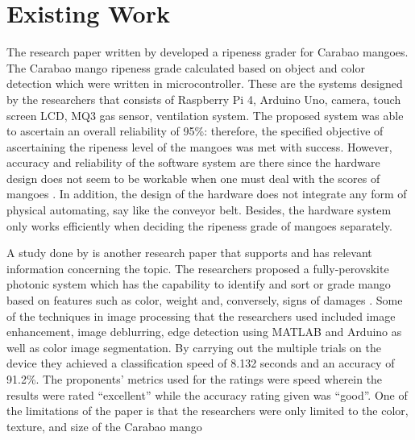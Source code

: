 

\section{Existing Work}

The research paper written by \citet{adam-non-destructive-2022} developed a ripeness grader for
Carabao mangoes. The Carabao mango ripeness grade calculated based on object and
color detection which were written in microcontroller. These are the systems designed
by the researchers that consists of Raspberry Pi 4, Arduino Uno, camera, touch screen
LCD, MQ3 gas sensor, ventilation system. The proposed system was able to ascertain an
overall reliability of 95\%: therefore, the specified objective of ascertaining the ripeness
level of the mangoes was met with success. However, accuracy and reliability of the
software system are there since the hardware design does not seem to be workable when
one must deal with the scores of mangoes \citep{adam-non-destructive-2022}. In addition, the design of the hardware does
not integrate any form of physical automating, say like the conveyor belt. Besides, the
hardware system only works efficiently when deciding the ripeness grade of mangoes
separately.

A study done by \citet{school-of-engineering-asia-pacific-college-philippines-carabao-2023} is another research paper that supports and has
relevant information concerning the topic. The researchers proposed a fully-perovskite
photonic system which has the capability to identify and sort or grade mango based on
features such as color, weight and, conversely, signs of damages \citep{school-of-engineering-asia-pacific-college-philippines-carabao-2023}. Some of the techniques
in image processing that the researchers used included image enhancement, image
deblurring, edge detection using MATLAB and Arduino as well as color image
segmentation. By carrying out the multiple trials on the device they achieved a
classification speed of 8.132 seconds and an accuracy of 91.2\%. The proponents’
metrics used for the ratings were speed wherein the results were rated “excellent” while
the accuracy rating given was “good”. One of the limitations of the paper is that the
researchers were only limited to the color, texture, and size of the Carabao mango

